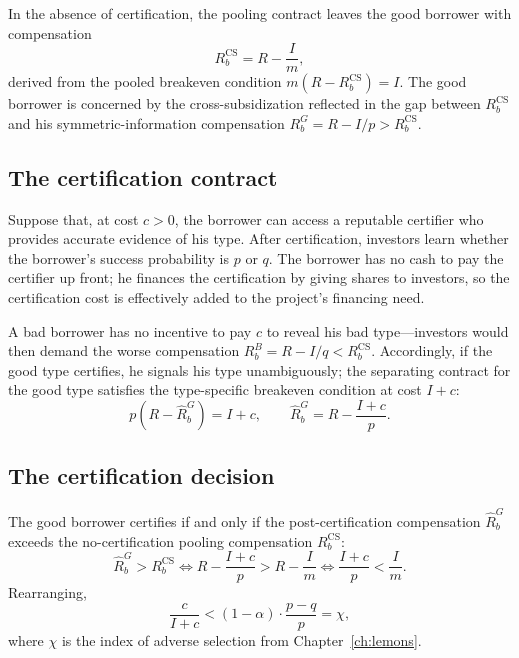 \documentclass[11pt,a4paper,oneside]{book}
\theoremstyle{plain}
\theoremstyle{definition}
\theoremstyle{remark}
\numberwithin{equation}{chapter}
\begin{document}
In the absence of certification, the pooling contract leaves the good borrower with compensation
\begin{equation}\label{eq:diss-cert-no-cert}
  R_b^{\text{CS}} = R - \frac{I}{m},
\end{equation}
derived from the pooled breakeven condition $m(R - R_b^{\text{CS}}) = I$.
The good borrower is concerned by the cross-subsidization reflected in the gap between $R_b^{\text{CS}}$ and his symmetric-information compensation $R_b^{G} = R - I/p > R_b^{\text{CS}}$.

\subsection{The certification contract}

Suppose that, at cost $c > 0$, the borrower can access a reputable certifier who provides accurate evidence of his type.
After certification, investors learn whether the borrower's success probability is $p$ or $q$.
The borrower has no cash to pay the certifier up front; he finances the certification by giving shares to investors, so the certification cost is effectively added to the project's financing need.

A bad borrower has no incentive to pay $c$ to reveal his bad type---investors would then demand the worse compensation $R_b^{B} = R - I/q < R_b^{\text{CS}}$.
Accordingly, if the good type certifies, he signals his type unambiguously; the separating contract for the good type satisfies the type-specific breakeven condition at cost $I + c$:
\begin{equation}\label{eq:diss-cert-contract}
  p(R - \widehat{R}_b^{G}) = I + c,
  \qquad
  \widehat{R}_b^{G} = R - \frac{I + c}{p}.
\end{equation}

\subsection{The certification decision}

The good borrower certifies if and only if the post-certification compensation $\widehat{R}_b^{G}$ exceeds the no-certification pooling compensation $R_b^{\text{CS}}$:
\begin{equation*}
  \widehat{R}_b^{G} > R_b^{\text{CS}}
  \Longleftrightarrow
  R - \frac{I + c}{p} > R - \frac{I}{m}
  \Longleftrightarrow
  \frac{I + c}{p} < \frac{I}{m}.
\end{equation*}
Rearranging,
\begin{equation}\label{eq:diss-cert-decision}
  \frac{c}{I + c} < (1 - \alpha) \cdot \frac{p - q}{p} = \chi,
\end{equation}
where $\chi$ is the index of adverse selection from Chapter~\ref{ch:lemons}.
\end{document}
